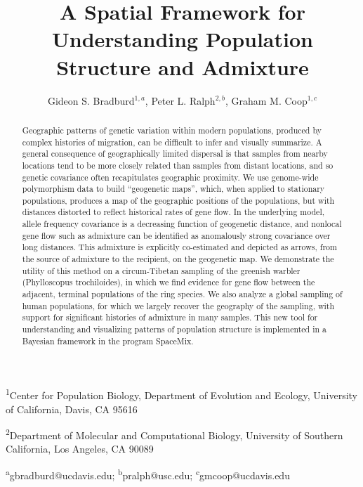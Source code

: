 \documentclass[12pt]{article}
\title{A Spatial Framework for Understanding Population Structure and Admixture}
\date{\vspace{-5ex}}
\author{Gideon S. Bradburd$^{1,a}$, Peter L. Ralph$^{2,b}$, Graham M. Coop$^{1,c}$}
\begin{document}
\maketitle

\textsuperscript{1}Center for Population Biology, Department of Evolution and Ecology, University of California, Davis, CA 95616

\textsuperscript{2}Department of Molecular and Computational Biology, University of Southern California, Los Angeles, CA 90089

\textsuperscript{a}gbradburd@ucdavis.edu; 
\textsuperscript{b}pralph@usc.edu;
\textsuperscript{c}gmcoop@ucdavis.edu\\\\\

\newpage
 

\begin{abstract}
Geographic patterns of genetic variation within modern populations, 
produced by complex histories of migration, 
can be difficult to infer and visually summarize. 
A general consequence of geographically limited dispersal 
is that samples from nearby locations tend to be more closely related than samples from distant locations, 
and so genetic covariance often recapitulates geographic proximity.  
We use genome-wide polymorphism data to build ``geogenetic maps'', 
which, when applied to stationary populations, 
produces a map of the geographic positions of the populations, 
but with distances distorted to reflect historical rates of gene flow.  
In the underlying model, allele frequency covariance is a decreasing function of geogenetic distance, 
and nonlocal gene flow such as admixture can be identified as anomalously strong covariance over long distances.  
This admixture is explicitly co-estimated and depicted as arrows, 
from the source of admixture to the recipient, on the geogenetic map.  
We demonstrate the utility of this method on a circum-Tibetan sampling of the greenish warbler (Phylloscopus trochiloides), 
in which we find evidence for gene flow between the adjacent, terminal populations of the ring species. 
We also analyze a global sampling of human populations, for which we largely recover the geography of the sampling, 
with support for significant histories of admixture in many samples.  
This new tool for understanding and visualizing patterns of population structure 
is implemented in a Bayesian framework in the program SpaceMix.
\end{abstract}

\newpage
\end{document}
